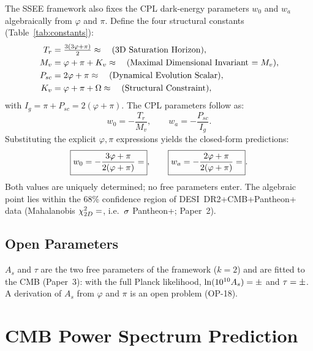 \documentclass[12pt,a4paper]{article}
\begin{document}
The SSEE framework also fixes the CPL dark-energy parameters $w_0$ and $w_a$
algebraically from $\varphi$ and $\pi$.
Define the four structural constants (Table~\ref{tab:constants}):
\begin{align}
  T_r    &= \tfrac{3(3\varphi+\pi)}{2} \approx \val{T_R_d4} \quad \text{(3D Saturation Horizon)}, \\
  M_v    &= \varphi+\pi+K_v            \approx \val{M_V_d4} \quad \text{(Maximal Dimensional Invariant $= M_v$)}, \\
  P_{sc} &= 2\varphi+\pi               \approx  \val{P_SC_d4} \quad \text{(Dynamical Evolution Scalar)}, \\
  K_v    &= \varphi+\pi+\Omega         \approx  \val{K_V_d4} \quad \text{(Structural Constraint)},
\end{align}
with $I_g=\pi+P_{sc}=2(\varphi+\pi)$.
The CPL parameters follow as:
\begin{equation}
  w_0 = -\frac{T_r}{M_v}, \qquad w_a = -\frac{P_{sc}}{I_g}.
\end{equation}
Substituting the explicit $\varphi,\pi$ expressions yields the closed-form predictions:
\begin{equation}
  \boxed{w_0 = -\frac{3\varphi+\pi}{2(\varphi+\pi)} = \val{W0_d6}},
  \qquad
  \boxed{w_a = -\frac{2\varphi+\pi}{2(\varphi+\pi)} = \val{WA_d6}}.
  \label{eq:w0wa_p4}
\end{equation}
Both values are uniquely determined; no free parameters enter.
The algebraic point lies within the 68\% confidence region
of DESI~DR2+CMB+Pantheon+ data \citep{desidr2_2025}
(Mahalanobis $\chi^2_{2D}=\val{p2_chi2_2D_ec26}$, i.e.\ $\val{p2_w0wa_ssee_ec26}\sigma$ Pantheon+; Paper~2).

\subsection{Open Parameters}

$A_s$ and $\tau$ are the two free parameters of the framework ($k=2$) and are
fitted to the CMB (Paper~3): with the full Planck likelihood,
$\ln(10^{10}A_s)=\val{b1_logA_ssee}\pm\val{b1_logA_ssee_s}$ and
$\tau=\val{b1_tau_ssee}\pm\val{b1_tau_ssee_s}$. A derivation of $A_s$ from
$\varphi$ and $\pi$ is an open problem (OP-18).

\section{CMB Power Spectrum Prediction}
\label{sec:cmb}
\end{document}
